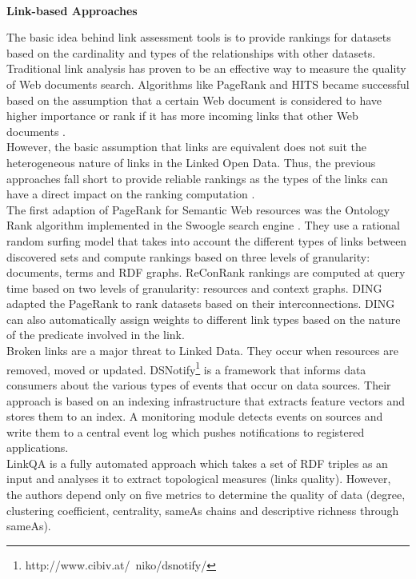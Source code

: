 \documentclass[onecolumn, crcready]{iosart2c}
\begin{document}
\indent \\{\bf Link-based Approaches}

The basic idea behind link assessment tools is to provide rankings for datasets based on the cardinality and types of the relationships with other datasets. Traditional link analysis has proven to be an effective way to measure the quality of Web documents search. Algorithms like PageRank \cite{Lawrence981} and HITS \cite{Kleinberg:1999} became successful based on the assumption that a certain Web document is considered to have higher importance or rank if it has more incoming links that other Web documents \cite{Brin:1998}\cite{Chakrabarti99miningthe}.\\ However, the basic assumption that links are equivalent does not suit the heterogeneous nature of links in the Linked Open Data. Thus, the previous approaches fall short to provide reliable rankings as the types of the links can have a direct impact on the ranking computation \cite{Toupikov2009}.\\ The first adaption of PageRank for Semantic Web resources was the Ontology Rank algorithm implemented in the Swoogle search engine \cite{Ding2004}. They use a rational random surfing model that takes into account the different types of links between discovered sets and compute rankings based on three levels of granularity: documents, terms and RDF graphs. ReConRank \cite{Hogan06reconrank:a} rankings are computed at query time based on two levels of granularity: resources and context graphs. DING \cite{Toupikov2009} adapted the PageRank to rank datasets based on their interconnections. DING can also automatically assign weights to different link types based on the nature of the predicate involved in the link.\\Broken links are a major threat to Linked Data. They occur when resources are removed, moved or updated. DSNotify\footnote{http://www.cibiv.at/~niko/dsnotify/}\cite{cs142} is a framework that informs data consumers about the various types of events that occur on data sources. Their approach is based on an indexing infrastructure that extracts feature vectors and stores them to an index. A monitoring module detects events on sources and write them to a central event log which pushes notifications to registered applications.\\ LinkQA \cite{Gueret2012} is a fully automated approach which takes a set of RDF triples as an input and analyses it to extract topological measures (links quality). However, the authors depend only on five metrics to determine the quality of data (degree, clustering coefficient, centrality, sameAs chains and descriptive richness through sameAs).\\
\end{document}
